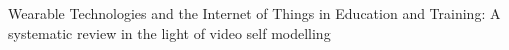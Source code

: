 Wearable Technologies and the Internet of Things
in Education and Training: A systematic review in the light of video self modelling